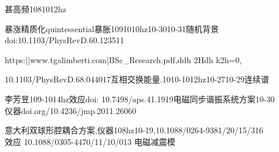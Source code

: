 \documentclass[12pt]{ctexart}
\title{}
\author{}
\begin{document}
甚高频1081012hz

暴涨精质化quintessential暴胀1091010hz10-3010-31随机背景\\doi:10.1103/PhysRevD.60.123511

https:||www.tgalimberti.com|BSc\_Research.pdf,ddh 2Hdh k2h=0,

10.1103/PhysRevD.68.044017互相交换能量.1010-1012hz10-2710-29连续谱



李芳昱109-1014hz效应doi: 10.7498/aps.41.1919电磁同步谐振系统方案10-30\\仪器doi.org/10.4236/jmp.2011.26060

意大利双球形腔耦合方案,仪器108hz10-19,10.1088/0264-9381/20/15/316\\效应 
10.1088/0305-4470/11/10/013 电磁减震模
\end{document}
